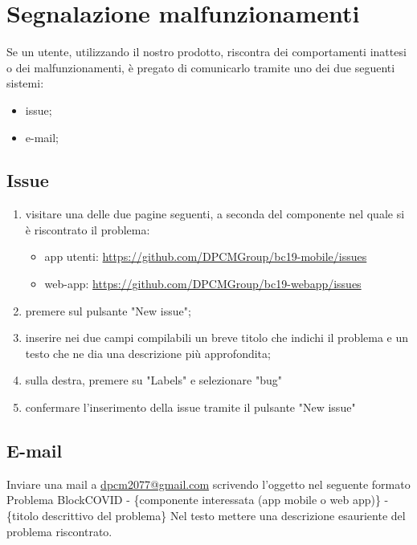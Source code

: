 \section{Segnalazione malfunzionamenti}
Se un utente, utilizzando il nostro prodotto, riscontra dei comportamenti inattesi o dei malfunzionamenti, è pregato di comunicarlo tramite uno dei due seguenti sistemi:
\begin{itemize}
	\item issue;
	\item e-mail;
\end{itemize}
\subsection{Issue}
\begin{enumerate}
	\item visitare una delle due pagine seguenti, a seconda del componente nel quale si è riscontrato il problema:
	\begin{itemize}
		\item app utenti: \url{https://github.com/DPCMGroup/bc19-mobile/issues}
		\item web-app: \url{https://github.com/DPCMGroup/bc19-webapp/issues}
	\end{itemize}
	\item premere sul pulsante "New issue";
	\item inserire nei due campi compilabili un breve titolo che indichi il problema e un testo che ne dia una descrizione più approfondita;
	\item sulla destra, premere su "Labels" e selezionare "bug"
	\item confermare l'inserimento della issue tramite il pulsante "New issue"
\end{enumerate}
\subsection{E-mail}
Inviare una mail a \href{mailto:dpcm2077@gmail.com}{dpcm2077@gmail.com} scrivendo l'oggetto nel seguente formato \newline
Problema BlockCOVID - \{componente interessata (app mobile o web app)\} - \{titolo descrittivo del problema\} \newline
Nel testo mettere una descrizione esauriente del problema riscontrato.
